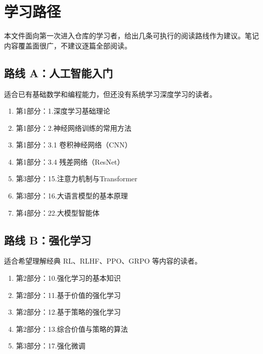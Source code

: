 \hypertarget{ux5b66ux4e60ux8defux5f84}{%
\chapter{学习路径}\label{ux5b66ux4e60ux8defux5f84}}

本文件面向第一次进入仓库的学习者，给出几条可执行的阅读路线作为建议。笔记内容覆盖面很广，不建议逐篇全部阅读。

\hypertarget{ux8defux7ebf-aux4ebaux5de5ux667aux80fdux5165ux95e8}{%
\section{路线 A：人工智能入门}\label{ux8defux7ebf-aux4ebaux5de5ux667aux80fdux5165ux95e8}}

适合已有基础数学和编程能力，但还没有系统学习深度学习的读者。

\begin{enumerate}
\def\labelenumi{\arabic{enumi}.}
\tightlist
\item
  第1部分：1.深度学习基础理论
\item
  第1部分：2.神经网络训练的常用方法
\item
  第1部分：3.1 卷积神经网络（CNN）
\item
  第1部分：3.4 残差网络（ResNet）
\item
  第3部分：15.注意力机制与Transformer
\item
  第3部分：16.大语言模型的基本原理
\item
  第4部分：22.大模型智能体
\end{enumerate}

\hypertarget{ux8defux7ebf-bux5f3aux5316ux5b66ux4e60}{%
\section{路线 B：强化学习}\label{ux8defux7ebf-bux5f3aux5316ux5b66ux4e60}}

适合希望理解经典 RL、RLHF、PPO、GRPO 等内容的读者。

\begin{enumerate}
\def\labelenumi{\arabic{enumi}.}
\tightlist
\item
  第2部分：10.强化学习的基本知识
\item
  第2部分：11.基于价值的强化学习
\item
  第2部分：12.基于策略的强化学习
\item
  第2部分：13.综合价值与策略的算法
\item
  第3部分：17.强化微调
\end{enumerate}

